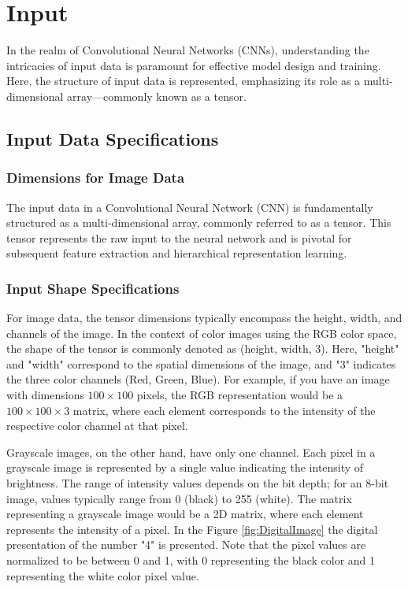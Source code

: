 \section{Input}

In the realm of Convolutional Neural Networks (CNNs), understanding the intricacies of input data is paramount for effective model design and training. Here, the structure of input data is represented, emphasizing its role as a multi-dimensional array—commonly known as a tensor.

\subsection{Input Data Specifications}


\subsubsection{Dimensions for Image Data}

The input data in a Convolutional Neural Network (CNN) is fundamentally structured as a multi-dimensional array, commonly referred to as a tensor. This tensor represents the raw input to the neural network and is pivotal for subsequent feature extraction and hierarchical representation learning.

\subsubsection{Input Shape Specifications}

For image data, the tensor dimensions typically encompass the height, width, and channels of the image. In the context of color images using the RGB color space, the shape of the tensor is commonly denoted as (height, width, 3). Here, "height" and "width" correspond to the spatial dimensions of the image, and "3" indicates the three color channels (Red, Green, Blue). For example, if you have an image with dimensions $100 \times 100$ pixels, the RGB representation would be a $100 \times 100 \times 3$ matrix, where each element corresponds to the intensity of the respective color channel at that pixel.

Grayscale images, on the other hand, have only one channel. Each pixel in a grayscale image is represented by a single value indicating the intensity of brightness. The range of intensity values depends on the bit depth; for an 8-bit image, values typically range from 0 (black) to 255 (white). The matrix representing a grayscale image would be a 2D matrix, where each element represents the intensity of a pixel. In the Figure \ref{fig:DigitalImage} the digital presentation of the number "4" is presented. Note that the pixel values are normalized to be between 0 and 1, with 0 representing the black color and 1 representing the white color pixel value. 

